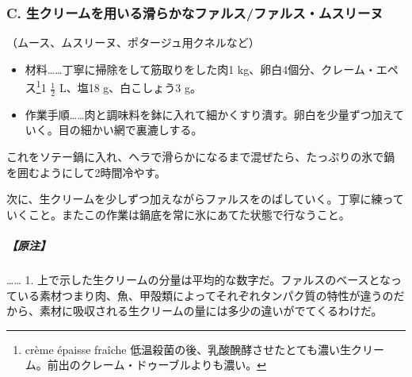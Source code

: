 \begin{recette}
\atoaki{}

\hypertarget{farce-c}{%
\subsubsection{C.
生クリームを用いる滑らかなファルス/ファルス・ムスリーヌ}\label{farce-c}}



（ムース、ムスリーヌ、ポタージュ用クネルなど）

\begin{itemize}
\item
  材料\ldots{}\ldots{}丁寧に掃除をして筋取りをした肉1
  kg、卵白4個分、クレーム・エペス\footnote{crème épaisse fraîche
    低温殺菌の後、乳酸醗酵させたとても濃い生クリーム。前出のクレーム・ドゥーブルよりも濃い。}1
  \(\frac{1}{2}\) L、塩18 g、白こしょう3 g。
\item
  作業手順\ldots{}\ldots{}肉と調味料を鉢に入れて細かくすり潰す。卵白を少量ずつ加えていく。目の細かい網で裏漉しする。
\end{itemize}

これをソテー鍋に入れ、ヘラで滑らかになるまで混ぜたら、たっぷりの氷で鍋を囲むようにして2時間冷やす。

次に、生クリームを少しずつ加えながらファルスをのばしていく。丁寧に練っていくこと。またこの作業は鍋底を常に氷にあてた状態で行なうこと。

\hypertarget{nota-farce-c}{%
\subparagraph{【原注】}\label{nota-farce-c}}

\ldots{}\ldots{} 1.
上で示した生クリームの分量は平均的な数字だ。ファルスのベースとなっている素材つまり肉、魚、甲殻類によってそれぞれタンパク質の特性が違うのだから、素材に吸収される生クリームの量には多少の違いがでてくるわけだ。


\end{recette}
